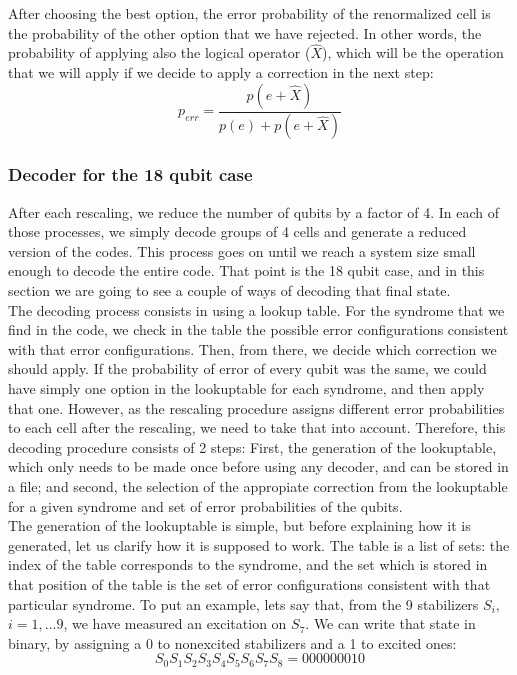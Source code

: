 \documentclass[a4paper,12pt]{article}
\begin{document}
After choosing the best option, the error probability of the renormalized cell is the probability of  the other option that we have rejected. In other words, the probability of applying also the logical operator ($\hat{X}$), which will be the operation that we will apply if we decide to apply a correction in the next step:
\begin{equation}
p_{err}=\frac{p(e+\hat{X})}{p(e)+p(e+\hat{X})}
\end{equation}

\subsubsection{Decoder for the 18 qubit case}

After each rescaling, we reduce the number of qubits by a factor of 4. In each of those processes, we simply decode groups of 4 cells and generate a reduced version of the codes. This process goes on until we reach a system size small enough to decode the entire code. That point is the 18 qubit case, and in this section we are going to see a couple of ways of decoding that final state.\\

The decoding process consists in using a lookup table. For the syndrome that we find in the code, we check in the table the possible error configurations consistent with that error configurations. Then, from there, we decide which correction we should apply. If the probability of error of every qubit was the same, we could have simply one option in the lookuptable for each syndrome, and then apply that one. However, as the rescaling procedure assigns different error probabilities to each cell after the rescaling, we need to take that into account. Therefore, this decoding procedure consists of 2 steps: First, the generation of the lookuptable, which only needs to be made once before using any decoder, and can be stored in a file; and second, the selection of the appropiate correction from the lookuptable for a given syndrome and set of error probabilities of the qubits.\\

The generation of the lookuptable is simple, but before explaining how it is generated, let us clarify how it is supposed to work. The table is a list of sets: the index of the table corresponds to the syndrome, and the set which is stored in that position of the table is the set of error configurations consistent with that particular syndrome. To put an example, lets say that, from the 9 stabilizers $S_i,$ $i=1,...9$, we have measured an excitation on $S_7$. We can write that state in binary, by assigning a 0 to nonexcited stabilizers and a 1 to excited ones: 
$$S_0S_1S_2S_3S_4S_5S_6S_7S_8=000000010$$
\end{document}
